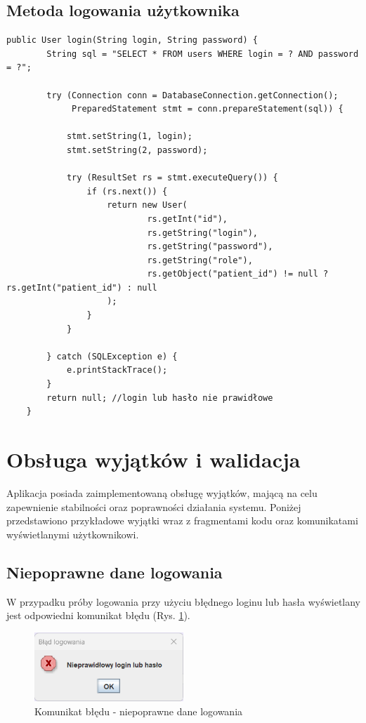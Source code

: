 \subsection{Metoda logowania użytkownika}
\begin{lstlisting}[style=javaStyle, caption={Metoda logowania użytkownika z wykorzystaniem JDBC}]
 public User login(String login, String password) {
        String sql = "SELECT * FROM users WHERE login = ? AND password = ?";

        try (Connection conn = DatabaseConnection.getConnection();
             PreparedStatement stmt = conn.prepareStatement(sql)) {

            stmt.setString(1, login);
            stmt.setString(2, password);

            try (ResultSet rs = stmt.executeQuery()) {
                if (rs.next()) {
                    return new User(
                            rs.getInt("id"),
                            rs.getString("login"),
                            rs.getString("password"),
                            rs.getString("role"),
                            rs.getObject("patient_id") != null ? rs.getInt("patient_id") : null
                    );
                }
            }

        } catch (SQLException e) {
            e.printStackTrace();
        }
        return null; //login lub hasło nie prawidłowe
    }
\end{lstlisting}

\section{Obsługa wyjątków i walidacja}
Aplikacja posiada zaimplementowaną obsługę wyjątków, mającą na celu zapewnienie stabilności oraz poprawności działania systemu. Poniżej przedstawiono przykładowe wyjątki wraz z fragmentami kodu oraz komunikatami wyświetlanymi użytkownikowi.

\subsection{Niepoprawne dane logowania}

W przypadku próby logowania przy użyciu błędnego loginu lub hasła wyświetlany jest odpowiedni komunikat błędu (Rys. \ref{fig:falseLogin}).

\begin{figure}[H]
\centering
\includegraphics[width=0.5\textwidth]{figures/FalseDataforLogin.png}
\caption{Komunikat błędu - niepoprawne dane logowania}
\label{fig:falseLogin}
\end{figure}


